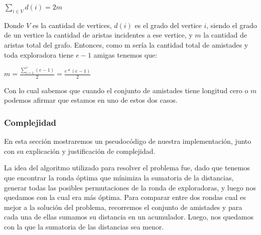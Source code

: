 \documentclass[11pt]{article}
\begin{document}
\vspace{3mm}

\begin{center}
$\sum\nolimits_{i \in V}d(i) = 2m$ 
\end{center}

\vspace{3mm}

Donde $V$ es la cantidad de vertices, $d(i)$ es el grado del vertice $i$, siendo el grado de un vertice la 
cantidad de aristas incidentes a ese vertice, y $m$ la cantidad de aristas total del grafo. Entonces, como
m sería la cantidad total de amistades y toda exploradora tiene $e-1$ amigas tenemos que:

\vspace{3mm}

\begin{center}
$m = \frac{\sum\limits_{i=1}^e (e-1)}{2} = \frac{e*(e-1)}{2}$
\end{center}

\vspace{3mm}

Con lo cual sabemos que cuando el conjunto de amistades tiene longitud cero o $m$ podemos afirmar que estamos 
en uno de estos dos casos.


\subsubsection{Complejidad}

En esta sección mostraremos un pseudocódigo de nuestra implementación, junto con su explicación y justificación
de complejidad.

La idea del algoritmo utilizado para resolver el problema fue, dado que tenemos que encontrar la ronda óptima
que mínimiza la sumatoria de la distancias, generar todas las posibles permutaciones de la ronda de exploradoras,
y luego nos quedamos con la cual era más óptima. Para comparar entre dos rondas cual es mejor a la solución del problema, 
recorremos el conjunto de amistades y para cada una de ellas sumamos su distancia en un acumulador. Luego, nos quedamos
con la que la sumatoria de las distancias sea menor.
\end{document}
